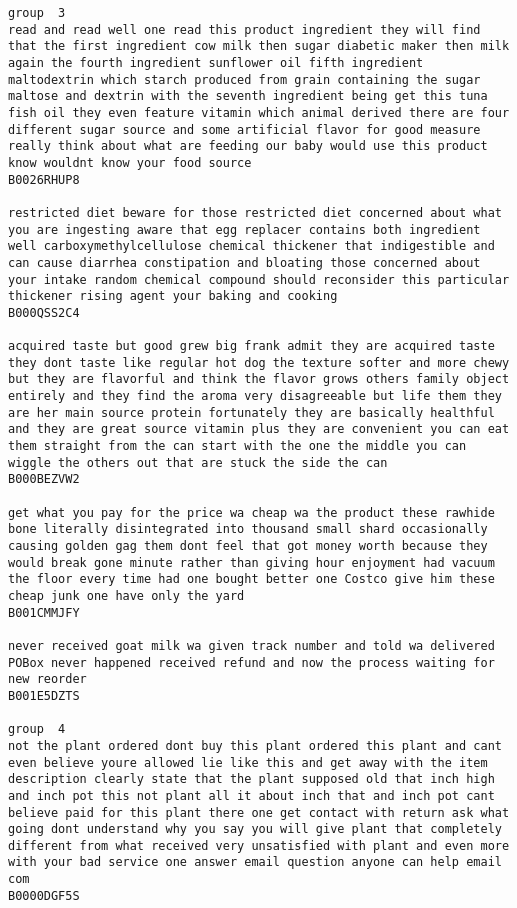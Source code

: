 \documentclass[11pt]{article}
\begin{document}
\begin{Verbatim}[commandchars=\\\{\}]
group  3
read and read well one read this product ingredient they will find that the first ingredient cow milk then sugar diabetic maker then milk again the fourth ingredient sunflower oil fifth ingredient maltodextrin which starch produced from grain containing the sugar maltose and dextrin with the seventh ingredient being get this tuna fish oil they even feature vitamin which animal derived there are four different sugar source and some artificial flavor for good measure really think about what are feeding our baby would use this product know wouldnt know your food source
B0026RHUP8

restricted diet beware for those restricted diet concerned about what you are ingesting aware that egg replacer contains both ingredient well carboxymethylcellulose chemical thickener that indigestible and can cause diarrhea constipation and bloating those concerned about your intake random chemical compound should reconsider this particular thickener rising agent your baking and cooking
B000QSS2C4

acquired taste but good grew big frank admit they are acquired taste they dont taste like regular hot dog the texture softer and more chewy but they are flavorful and think the flavor grows others family object entirely and they find the aroma very disagreeable but life them they are her main source protein fortunately they are basically healthful and they are great source vitamin plus they are convenient you can eat them straight from the can start with the one the middle you can wiggle the others out that are stuck the side the can
B000BEZVW2

get what you pay for the price wa cheap wa the product these rawhide bone literally disintegrated into thousand small shard occasionally causing golden gag them dont feel that got money worth because they would break gone minute rather than giving hour enjoyment had vacuum the floor every time had one bought better one Costco give him these cheap junk one have only the yard
B001CMMJFY

never received goat milk wa given track number and told wa delivered POBox never happened received refund and now the process waiting for new reorder
B001E5DZTS

group  4
not the plant ordered dont buy this plant ordered this plant and cant even believe youre allowed lie like this and get away with the item description clearly state that the plant supposed old that inch high and inch pot this not plant all it about inch that and inch pot cant believe paid for this plant there one get contact with return ask what going dont understand why you say you will give plant that completely different from what received very unsatisfied with plant and even more with your bad service one answer email question anyone can help email com
B0000DGF5S


\end{Verbatim}
\end{document}
